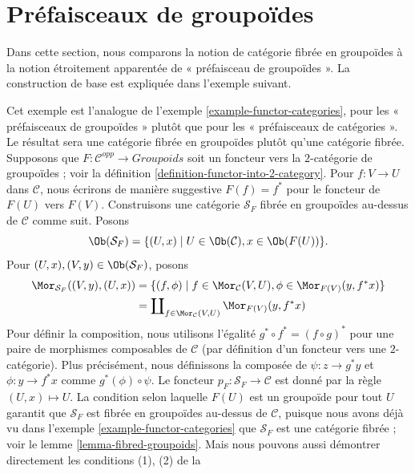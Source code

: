 \section{Préfaisceaux de groupoïdes}
\label{section-presheaves-groupoids}

\noindent
Dans cette section, nous comparons la notion de catégorie fibrée en groupoïdes
à la notion étroitement apparentée de « préfaisceau de groupoïdes ». La construction
de base est expliquée dans l'exemple suivant.

\begin{example}
\label{example-functor-groupoids}
Cet exemple est l'analogue de
l'exemple \ref{example-functor-categories},
pour les « préfaisceaux de groupoïdes » plutôt que pour les « préfaisceaux de catégories ».
Le résultat sera une catégorie fibrée en groupoïdes plutôt qu'une catégorie fibrée.
Supposons que $F : \mathcal{C}^{opp} \to \textit{Groupoids}$ soit un foncteur
vers la $2$-catégorie de groupoïdes ; voir la
définition \ref{definition-functor-into-2-category}.
Pour $f : V \to U$ dans $\mathcal{C}$, nous écrirons de manière suggestive
$F(f) = f^\ast$ pour le foncteur de $F(U)$ vers $F(V)$.
Construisons une catégorie $\mathcal{S}_F$ fibrée en groupoïdes au-dessus de $\mathcal{C}$
comme suit. Posons
$$
\Ob(\mathcal{S}_F) =
\{(U, x) \mid U\in \Ob(\mathcal{C}), x\in \Ob(F(U))\}.
$$
Pour $(U, x), (V, y) \in \Ob(\mathcal{S}_F)$, posons
\begin{align*}
\Mor_{\mathcal{S}_F}((V, y), (U, x))
& =
\{ (f, \phi) \mid f \in \Mor_\mathcal{C}(V, U),
\phi \in \Mor_{F(V)}(y, f^\ast x)\} \\
& =
\coprod\nolimits_{f \in \Mor_\mathcal{C}(V, U)}
\Mor_{F(V)}(y, f^\ast x)
\end{align*}
Pour définir la composition, nous utilisons l'égalité $g^\ast \circ f^\ast =
(f \circ g)^\ast$ pour une paire de morphismes composables de $\mathcal{C}$
(par définition d'un foncteur vers une $2$-catégorie).
Plus précisément, nous définissons la composée de $\psi : z \to g^\ast y$ et
$ \phi : y \to f^\ast x$ comme $ g^\ast(\phi) \circ \psi$. Le foncteur
$p_F : \mathcal{S}_F \to \mathcal{C}$ est donné par la règle $(U, x) \mapsto U$.
La condition selon laquelle $F(U)$ est un groupoïde pour tout $U$ garantit que
$\mathcal{S}_F$ est fibrée en groupoïdes au-dessus de $\mathcal{C}$, puisque nous avons
déjà vu dans
l'exemple \ref{example-functor-categories}
que $\mathcal{S}_F$ est une catégorie fibrée ; voir le
lemme \ref{lemma-fibred-groupoids}.
Mais nous pouvons aussi démontrer directement les conditions (1), (2) de la

\end{example}
